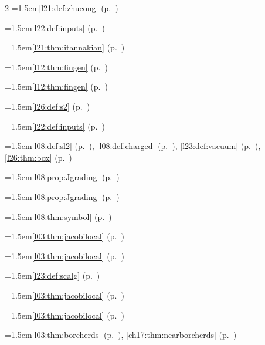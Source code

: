 \begin{multicols}{2}
\hangindent=1.5em\quad \ref{l21:def:zhucong} (p.~\pageref{l21:def:zhucong})\par
\hangindent=1.5em\quad \ref{l22:def:inputs} (p.~\pageref{l22:def:inputs})\par
\hangindent=1.5em\quad \ref{l21:thm:itannakian} (p.~\pageref{l21:thm:itannakian})\par
\hangindent=1.5em\quad \ref{l12:thm:fingen} (p.~\pageref{l12:thm:fingen})\par
\hangindent=1.5em\quad \ref{l12:thm:fingen} (p.~\pageref{l12:thm:fingen})\par
\hangindent=1.5em\quad \ref{l26:def:s2} (p.~\pageref{l26:def:s2})\par
\hangindent=1.5em\quad \ref{l22:def:inputs} (p.~\pageref{l22:def:inputs})\par
\par{}\par\nopagebreak\smallskip
\hangindent=1.5em\quad \ref{l08:def:sl2} (p.~\pageref{l08:def:sl2}), \ref{l08:def:charged} (p.~\pageref{l08:def:charged}), \ref{l23:def:vacuum} (p.~\pageref{l23:def:vacuum}), \ref{l26:thm:box} (p.~\pageref{l26:thm:box})\par
\hangindent=1.5em\quad \ref{l08:prop:Jgrading} (p.~\pageref{l08:prop:Jgrading})\par
\hangindent=1.5em\quad \ref{l08:prop:Jgrading} (p.~\pageref{l08:prop:Jgrading})\par
\hangindent=1.5em\quad \ref{l08:thm:symbol} (p.~\pageref{l08:thm:symbol})\par
\hangindent=1.5em\quad \ref{l03:thm:jacobilocal} (p.~\pageref{l03:thm:jacobilocal})\par
\hangindent=1.5em\quad \ref{l03:thm:jacobilocal} (p.~\pageref{l03:thm:jacobilocal})\par
\hangindent=1.5em\quad \ref{l23:def:scalg} (p.~\pageref{l23:def:scalg})\par
\hangindent=1.5em\quad \ref{l03:thm:jacobilocal} (p.~\pageref{l03:thm:jacobilocal})\par
\hangindent=1.5em\quad \ref{l03:thm:jacobilocal} (p.~\pageref{l03:thm:jacobilocal})\par
\hangindent=1.5em\quad \ref{l03:thm:borcherds} (p.~\pageref{l03:thm:borcherds}), \ref{ch17:thm:nearborcherds} (p.~\pageref{ch17:thm:nearborcherds})\par

\end{multicols}
